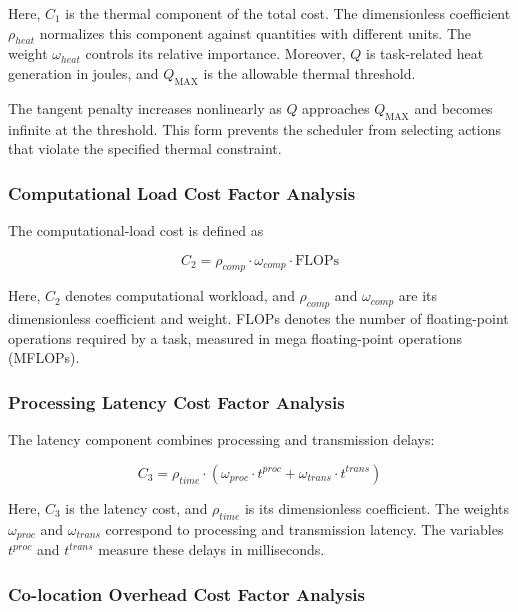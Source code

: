 \documentclass[lettersize,journal]{IEEEtran}
\begin{document}
Here, $C_{1}$ is the thermal component of the total cost. The dimensionless coefficient $\rho_{heat}$ normalizes this component against quantities with different units. The weight $\omega_{heat}$ controls its relative importance. Moreover, $Q$ is task-related heat generation in joules, and $Q_{\text{MAX}}$ is the allowable thermal threshold.

The tangent penalty increases nonlinearly as $Q$ approaches $Q_{\text{MAX}}$ and becomes infinite at the threshold. This form prevents the scheduler from selecting actions that violate the specified thermal constraint.

\subsubsection{Computational Load Cost Factor Analysis}

The computational-load cost is defined as

\begin{equation}
C_{2} = \rho_{comp} \cdot \omega_{comp} \cdot \text{FLOPs}
\label{eq:comp_cost}
\end{equation}

Here, $C_{2}$ denotes computational workload, and $\rho_{comp}$ and $\omega_{comp}$ are its dimensionless coefficient and weight. FLOPs denotes the number of floating-point operations required by a task, measured in mega floating-point operations (MFLOPs).

\subsubsection{Processing Latency Cost Factor Analysis}

The latency component combines processing and transmission delays:

\begin{equation}
C_{3} = \rho_{time} \cdot \left( \omega_{proc} \cdot t^{proc} + \omega_{trans} \cdot t^{trans} \right)
\label{eq:time_cost}
\end{equation}

Here, $C_{3}$ is the latency cost, and $\rho_{time}$ is its dimensionless coefficient. The weights $\omega_{proc}$ and $\omega_{trans}$ correspond to processing and transmission latency. The variables $t^{proc}$ and $t^{trans}$ measure these delays in milliseconds.

\subsubsection{Co-location Overhead Cost Factor Analysis}
\end{document}
